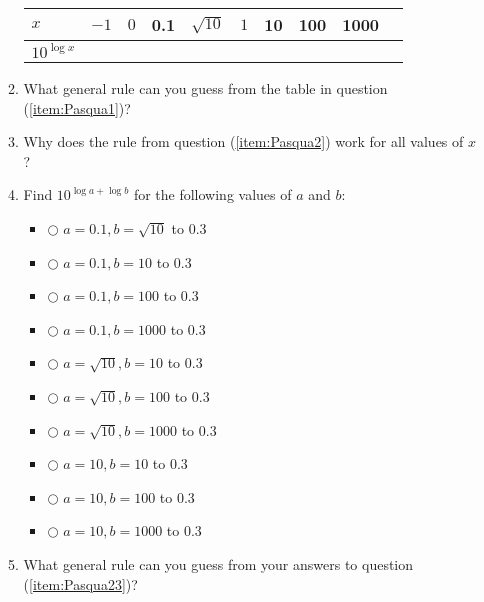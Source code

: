 \documentclass[11pt,dvipsnames]{article}
\newenvironment{myitemize}
{ \begin{itemize}
		\setlength{\itemsep}{10pt}
		\setlength{\parskip}{10pt}
		\setlength{\parsep}{10pt}     }
	{ \end{itemize}   
	
           }
\begin{document}
\begin{enumerate}[label= {\bf  \arabic*:},resume]
\begin{enumerate}
\begin{minipage}{\linewidth}
			{\setlength{\tabcolsep}{1.3em}  
				{\renewcommand{\arraystretch}{2}%
					\begin{tabular}{|l|l|l|l|l|l|l|l|l|l|}
						\hline
						$x$    & $-1$ & $0$ & 0.1& $\displaystyle \sqrt{10}$& $1$ & 10&100&1000  \\ \hline
						$\displaystyle 10^{\log x}$ &      &     &   &&&&&\\ \hline
					\end{tabular}}} \quad
				\end{minipage}	
	\item \label{item:Pasqua2} What general rule can you guess from the table in question (\ref{item:Pasqua1})?
	\item Why does the rule from question (\ref{item:Pasqua2})	work for all values of $x$?	
	\item \label{item:Pasqua23} Find $\displaystyle 10^{\log a + \log b}$ for the following values of $a$ and $b$:
	\medskip
	
	\begin{myitemize}
		\item[$\bigcirc$] $a=0.1, b=\sqrt{10}$ \hbox to 0.3\textwidth {\enspace\dotfill}
		\item[$\bigcirc$] $a=0.1, b=10$ \hbox to 0.3\textwidth {\enspace\dotfill}
		\item[$\bigcirc$] $a=0.1, b=100$ \hbox to 0.3\textwidth {\enspace\dotfill}
		\item[$\bigcirc$] $a=0.1, b=1000$ \hbox to 0.3\textwidth {\enspace\dotfill}
		\item[$\bigcirc$] $a=\sqrt{10}, b=10$ \hbox to 0.3\textwidth {\enspace\dotfill}
		\item[$\bigcirc$] $a=\sqrt{10}, b=100$ \hbox to 0.3\textwidth {\enspace\dotfill}
		\item[$\bigcirc$] $a=\sqrt{10}, b=1000$ \hbox to 0.3\textwidth {\enspace\dotfill}
		\item[$\bigcirc$] $a=10, b=10$ \hbox to 0.3\textwidth {\enspace\dotfill}
		\item[$\bigcirc$] $a=10, b=100$ \hbox to 0.3\textwidth {\enspace\dotfill}
		\item[$\bigcirc$] $a=10, b=1000$ \hbox to 0.3\textwidth {\enspace\dotfill}
	\end{myitemize}	
	\medskip
	
	\item What general rule can you guess from your answers to question (\ref{item:Pasqua23})?
		
\end{enumerate}

\end{enumerate}
\end{document}
